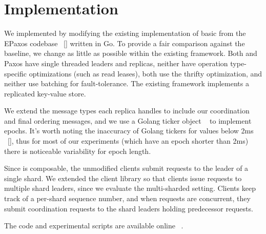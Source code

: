 \section{Implementation}
\label{sec:implementation}
We implemented \system by modifying the existing implementation of basic \mpaxos from the EPaxos codebase ~\ref{} written in Go. To provide a fair comparison against the \mpaxos baseline, we change as little as possible within the existing framework. Both \system and Paxos have single threaded leaders and replicas, neither have operation type-specific optimizations (such as read leases), both use the thrifty optimization, and neither use batching for fault-tolerance. The existing framework implements a replicated key-value store.

We extend the message types each replica handles to include our coordination and final ordering messages, and we use a Golang ticker object ~\cite{} to implement epochs. It's worth noting the inaccuracy of Golang tickers for values below 2ms ~\ref{}, thus for most of our experiments (which have an epoch shorter than 2ms) there is noticeable variability for epoch length.

Since \sdl is composable, the unmodified \mpaxos clients submit requests to the leader of a single shard. We extended the client library so that clients issue requests to multiple shard leaders, since we evaluate the multi-sharded setting. Clients keep track of a per-shard sequence number, and when requests are concurrent, they submit coordination requests to the shard leaders holding predecessor requests.

The code and experimental scripts are available online ~\cite{}.
